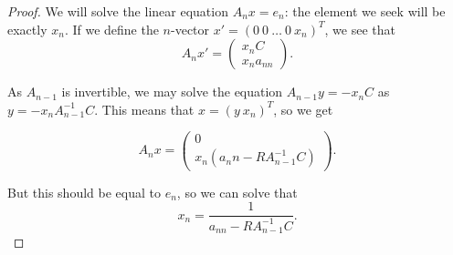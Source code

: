 \documentclass[12pt,a4paper,leqno]{report}
\theoremstyle{plain}
\theoremstyle{definition}
\theoremstyle{remark}
\begin{document}
\begin{proof}
We will solve the linear equation $A_n x = e_n$: the element we seek will be exactly $x_n$. If we define the $n$-vector  $x' = (0\ 0\ \ldots \ 0 \ x_n)^T$, we see that
\begin{equation*}
A_nx' =
\begin{pmatrix}
x_nC \\
x_na_{nn}
\end{pmatrix}.
\end{equation*}

As $A_{n-1}$ is invertible, we may solve the equation $A_{n-1}y = -x_nC$ as $y = -x_nA_{n-1}^{-1}C$. This means that $x = (y \ x_n)^T$, so we get

\begin{equation*}
A_{n}x = 
\begin{pmatrix}
0\\
x_n(a_nn-RA_{n-1}^{-1}C)
\end{pmatrix}.
\end{equation*}

But this should be equal to $e_n$, so we can solve that
\begin{equation*}
x_n = \frac{1}{a_{nn}-RA_{n-1}^{-1}C}.
\end{equation*}
\end{proof}
\end{document}
